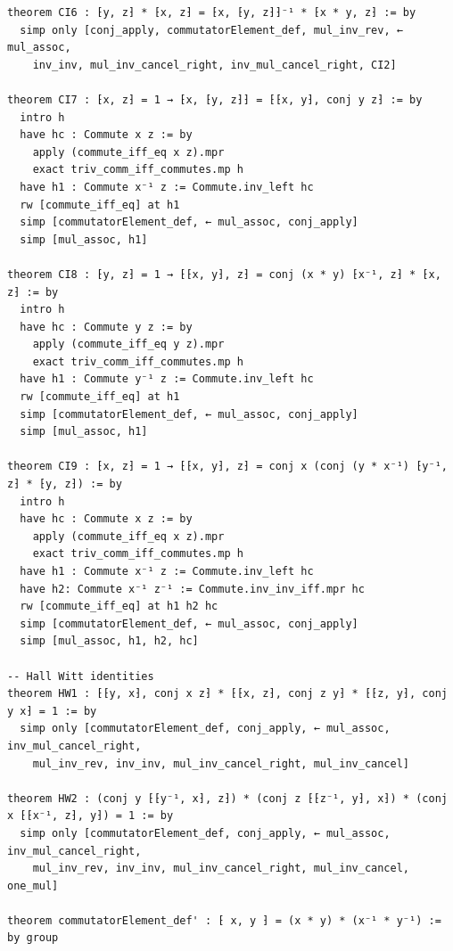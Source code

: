 \documentclass[10pt,a4paper]{article}
\begin{document}
\begin{Verbatim}
theorem CI6 : ⁅y, z⁆ * ⁅x, z⁆ = ⁅x, ⁅y, z⁆⁆⁻¹ * ⁅x * y, z⁆ := by
  simp only [conj_apply, commutatorElement_def, mul_inv_rev, ← mul_assoc,
    inv_inv, mul_inv_cancel_right, inv_mul_cancel_right, CI2]

theorem CI7 : ⁅x, z⁆ = 1 → ⁅x, ⁅y, z⁆⁆ = ⁅⁅x, y⁆, conj y z⁆ := by
  intro h
  have hc : Commute x z := by
    apply (commute_iff_eq x z).mpr
    exact triv_comm_iff_commutes.mp h
  have h1 : Commute x⁻¹ z := Commute.inv_left hc
  rw [commute_iff_eq] at h1
  simp [commutatorElement_def, ← mul_assoc, conj_apply]
  simp [mul_assoc, h1]

theorem CI8 : ⁅y, z⁆ = 1 → ⁅⁅x, y⁆, z⁆ = conj (x * y) ⁅x⁻¹, z⁆ * ⁅x, z⁆ := by
  intro h
  have hc : Commute y z := by
    apply (commute_iff_eq y z).mpr
    exact triv_comm_iff_commutes.mp h
  have h1 : Commute y⁻¹ z := Commute.inv_left hc
  rw [commute_iff_eq] at h1
  simp [commutatorElement_def, ← mul_assoc, conj_apply]
  simp [mul_assoc, h1]

theorem CI9 : ⁅x, z⁆ = 1 → ⁅⁅x, y⁆, z⁆ = conj x (conj (y * x⁻¹) ⁅y⁻¹, z⁆ * ⁅y, z⁆) := by
  intro h
  have hc : Commute x z := by
    apply (commute_iff_eq x z).mpr
    exact triv_comm_iff_commutes.mp h
  have h1 : Commute x⁻¹ z := Commute.inv_left hc
  have h2: Commute x⁻¹ z⁻¹ := Commute.inv_inv_iff.mpr hc
  rw [commute_iff_eq] at h1 h2 hc
  simp [commutatorElement_def, ← mul_assoc, conj_apply]
  simp [mul_assoc, h1, h2, hc]

-- Hall Witt identities
theorem HW1 : ⁅⁅y, x⁆, conj x z⁆ * ⁅⁅x, z⁆, conj z y⁆ * ⁅⁅z, y⁆, conj y x⁆ = 1 := by
  simp only [commutatorElement_def, conj_apply, ← mul_assoc, inv_mul_cancel_right,
    mul_inv_rev, inv_inv, mul_inv_cancel_right, mul_inv_cancel]

theorem HW2 : (conj y ⁅⁅y⁻¹, x⁆, z⁆) * (conj z ⁅⁅z⁻¹, y⁆, x⁆) * (conj x ⁅⁅x⁻¹, z⁆, y⁆) = 1 := by
  simp only [commutatorElement_def, conj_apply, ← mul_assoc, inv_mul_cancel_right,
    mul_inv_rev, inv_inv, mul_inv_cancel_right, mul_inv_cancel, one_mul]

theorem commutatorElement_def' : ⁅ x, y ⁆ = (x * y) * (x⁻¹ * y⁻¹) := by group
\end{Verbatim}
\end{document}
